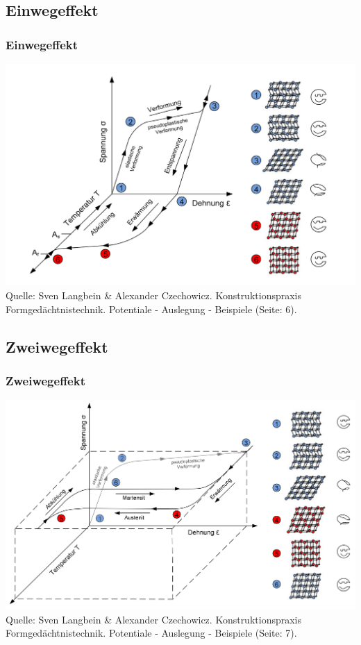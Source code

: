 \subsection{Einwegeffekt}
\begin{frame}[t]\frametitle{Einwegeffekt}
	\centering
	\includegraphics[height=0.5\textwidth]{medien/Verhalten_beim_Einwegeffekt.png}
	\\
	\tiny{Quelle: Sven Langbein \& Alexander Czechowicz. Konstruktionspraxis
	Formgedächtnistechnik. Potentiale - Auslegung - Beispiele (Seite: 6).}
\end{frame}

\subsection{Zweiwegeffekt}
\begin{frame}[t]\frametitle{Zweiwegeffekt}
	\centering
	\includegraphics[height=0.5\textwidth]{medien/Verhalten_beim_Zweiwegeffekt.png}
	\\
	\tiny{Quelle: Sven Langbein \& Alexander Czechowicz. Konstruktionspraxis
	Formgedächtnistechnik. Potentiale - Auslegung - Beispiele (Seite: 7).}
\end{frame}

